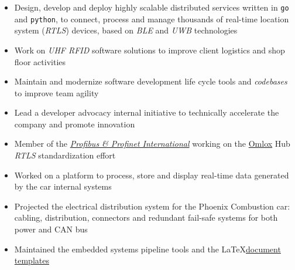 \documentclass[9pt,a4paper,ragged2e,withhyper]{altacv}
\begin{document}
\begin{paracol}{2}


\begin{itemize}
  \item Design, develop and deploy highly scalable distributed services written in \texttt{go} and \texttt{python}, to connect, process and manage thousands of real-time location system (\textit{RTLS}) devices, based on \textit{BLE} and \textit{UWB} technologies
  \item Work on \textit{UHF RFID} software solutions to improve client logistics and shop floor activities
  \item Maintain and modernize software development life cycle tools and \textit{codebases} to improve team agility
  \item Lead a developer advocacy internal initiative to technically accelerate the company and promote innovation
  \item Member of the \href{https://www.profibus.com/technology/omlox}{\textit{Profibus \& Profinet International}} working on the \href{https://omlox.com/}{Omlox} Hub \textit{RTLS} standardization effort
\end{itemize}


\begin{itemize}
  \item Worked on a platform to process, store and display real-time data generated by the car internal systems
  \item Projected the electrical distribution system for the Phoenix Combustion car: cabling, distribution, connectors and redundant fail-safe systems for both power and CAN bus
  \item Maintained the embedded systems pipeline tools and the \LaTeX \linebreak \href{https://github.com/engeniusua/engenius-ua-latex-template}{document templates}
\end{itemize}



\end{paracol}
\end{document}
